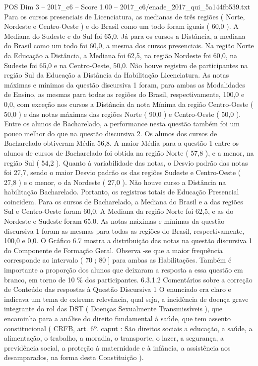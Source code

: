 \begin{textsample}{POS Dim 3 – 2017\_c6 – Score 1.00 – 2017\_c6/enade\_2017\_qui\_5a144fb539.txt}
Para os cursos presenciais de Licenciatura, as medianas de três regiões ( Norte, Nordeste e Centro-Oeste ) e do Brasil como um todo foram iguais ( 60,0 ).
A Mediana do Sudeste e do Sul foi 65,0.
Já para os cursos a Distância, a mediana do Brasil como um todo foi 60,0, a mesma dos cursos presenciais.
Na região Norte da Educação a Distância, a Mediana foi 62,5, na região Nordeste foi 60,0, na Sudeste foi 65,0 e na Centro-Oeste, 50,0.
Não houve registro de participantes na região Sul da Educação a Distância da Habilitação Licenciatura.
As notas máximas e mínimas da questão discursiva 1 foram, para ambas as Modalidades de Ensino, as mesmas para todas as regiões do Brasil, respectivamente, 100,0 e 0,0, com exceção nos cursos a Distância da nota Mínima da região Centro-Oeste ( 50,0 ) e das notas máximas das regiões Norte ( 90,0 ) e Centro-Oeste ( 50,0 ).
Entre os alunos de Bacharelado, a performance nesta questão também foi um pouco melhor do que na questão discursiva 2.
Os alunos dos cursos de Bacharelado obtiveram Média 56,8.
A maior Média para a questão 1 entre os alunos de cursos de Bacharelado foi obtida na região Norte ( 57,8 ), e a menor, na região Sul ( 54,2 ).
Quanto à variabilidade das notas, o Desvio padrão das notas foi 27,7, sendo o maior Desvio padrão os das regiões Sudeste e Centro-Oeste ( 27,8 ) e o menor, o da Nordeste ( 27,0 ).
Não houve curso a Distância na habilitação Bacharelado.
Portanto, os registros totais de Educação Presencial coincidem.
Para os cursos de Bacharelado, a Mediana do Brasil e a das regiões Sul e Centro-Oeste foram 60,0.
A Mediana da região Norte foi 62,5, e as do Nordeste e Sudeste foram 65,0.
As notas máximas e mínimas da questão discursiva 1 foram as mesmas para todas as regiões do Brasil, respectivamente, 100,0 e 0,0.
O Gráfico 6.7 mostra a distribuição das notas na questão discursiva 1 do Componente de Formação Geral.
Observa -se que a maior frequência corresponde ao intervalo ( 70 ; 80 ] para ambas as Habilitações.
Também é importante a proporção dos alunos que deixaram a resposta a essa questão em branco, em torno de 10 \% dos participantes. 6.3.1.2 Comentários sobre a correção de Conteúdo das respostas à Questão Discursiva 1 O enunciado era claro e indicava um tema de extrema relevância, qual seja, a incidência de doença grave integrante do rol das DST ( Doenças Sexualmente Transmissíveis ), que encaminha para a análise do direito fundamental à saúde, que tem assento constitucional ( CRFB, art. 6º. caput : São direitos sociais a educação, a saúde, a alimentação, o trabalho, a moradia, o transporte, o lazer, a segurança, a previdência social, a proteção à maternidade e à infância, a assistência aos desamparados, na forma desta Constituição ).

\end{textsample}
